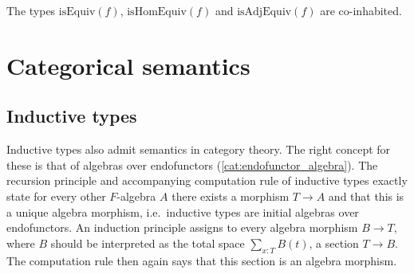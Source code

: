     \begin{property}
        The types $\mathrm{isEquiv}(f)$, $\mathrm{isHomEquiv}(f)$ and $\mathrm{isAdjEquiv}(f)$ are co-inhabited.
    \end{property}

\section{Categorical semantics}
\subsection{Inductive types}

    Inductive types also admit semantics in category theory. The right concept for these is that of algebras over endofunctors (\cref{cat:endofunctor_algebra}). The recursion principle and accompanying computation rule of inductive types exactly state for every other $F$-algebra $A$ there exists a morphism $T\rightarrow A$ and that this is a unique algebra morphism, i.e.~inductive types are initial algebras over endofunctors. An induction principle assigns to every algebra morphism $B\rightarrow T$, where $B$ should be interpreted as the total space $\sum_{x:T}B(t)$, a section $T\rightarrow B$. The computation rule then again says that this section is an algebra morphism.

